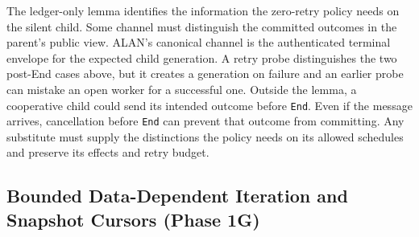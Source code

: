 \documentclass[11pt,a4paper]{article}
\theoremstyle{definition}
\theoremstyle{remark}
\begin{document}
The ledger-only lemma identifies the information the zero-retry policy needs on the silent child. Some channel must distinguish the committed outcomes in the parent's public view. ALAN's canonical channel is the authenticated terminal envelope for the expected child generation. A retry probe distinguishes the two post-End cases above, but it creates a generation on failure and an earlier probe can mistake an open worker for a successful one. Outside the lemma, a cooperative child could send its intended outcome before \texttt{End}. Even if the message arrives, cancellation before \texttt{End} can prevent that outcome from committing. Any substitute must supply the distinctions the policy needs on its allowed schedules and preserve its effects and retry budget.

\subsection{Bounded Data-Dependent Iteration and Snapshot Cursors (Phase 1G)}
\end{document}
